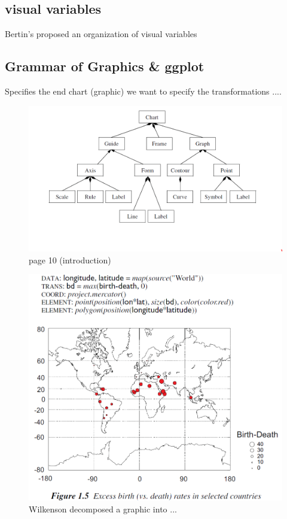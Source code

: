 \documentclass[letterpaper,onecolumn,titlepage]{Ythesis}
\begin{document}
\subsection{visual variables}
Bertin's proposed an organization of visual variables \cite{bertinIIPropertiesGraphic2011} 


\subsection{Grammar of Graphics \& ggplot}
Specifies the end chart (graphic)
we want to specify the transformations ....
\begin{figure}
    \includegraphics{figures/intro/grammar_chart_composition.png}
    \caption{page 10 (introduction)}
\end{figure}
\begin{figure}
    \includegraphics{figures/intro/grammar_example.png}
    \caption{Wilkenson decomposed a graphic into ...} 
\end{figure}
\end{document}
